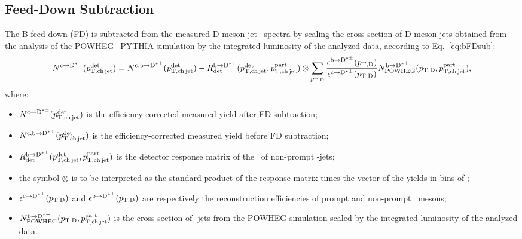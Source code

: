 \subsection{Feed-Down Subtraction}
The B feed-down (FD) is subtracted from the measured D-meson jet \pt\ spectra by scaling the cross-section of D-meson jets obtained from the analysis of the POWHEG+PYTHIA simulation by the integrated luminosity of the analyzed data, according to Eq.~\ref{eq:bFDsub}:
\begin{equation}
N^{\rm c\rightarrow\mathrm{D^{*\pm}}}(p_{\mathrm{T,ch\,jet}}^{\mathrm{det}}) = 
N^{\rm c,b\rightarrow\mathrm{D^{*\pm}}}(p_{\mathrm{T,ch\,jet}}^{\mathrm{det}}) - 
R_{\rm det}^{\rm b\rightarrow\mathrm{D^{*\pm}}}(p_{\mathrm{T,ch\,jet}}^{\mathrm{det}},p_{\mathrm{T,ch\,jet}}^{\mathrm{part}}) \otimes \sum_{p_{\mathrm{T,D}}} \frac{\epsilon^{\rm b\rightarrow\mathrm{D^{*\pm}}}(p_{\mathrm{T,D}})}{\epsilon^{\rm c\rightarrow\mathrm{D^{*\pm}}}(p_{\mathrm{T,D}})} N^{\rm b\rightarrow\mathrm{D^{*\pm}}}_{\rm POWHEG}(p_{\mathrm{T,D}},p_{\mathrm{T,ch\,jet}}^{\mathrm{part}}),
\label{eq:bFDsub}
\end{equation}
where:
\begin{itemize}
\item $N^{\rm c\rightarrow\mathrm{D^{*\pm}}}(p_{\mathrm{T,ch\,jet}}^{\mathrm{det}})$ is the efficiency-corrected measured yield after FD subtraction; 
\item $N^{\rm c,b\rightarrow\mathrm{D^{*\pm}}}(p_{\mathrm{T,ch\,jet}}^{\mathrm{det}})$ is the efficiency-corrected measured yield before FD subtraction;
\item $R_{\rm det}^{\rm b\rightarrow\mathrm{D^{*\pm}}}(p_{\mathrm{T,ch\,jet}}^{\mathrm{det}},p_{\mathrm{T,ch\,jet}}^{\mathrm{part}})$ is the detector response matrix of the \pt\ of non-prompt \Dstar-jets;
\item the symbol $\otimes$ is to be interpreted as the standard product of the response matrix times the vector of the yields in bins of \ptchjetgen;
\item $\epsilon^{\rm c\rightarrow\mathrm{D^{*\pm}}}(p_{\mathrm{T,D}})$ and $\epsilon^{\rm b\rightarrow\mathrm{D^{*\pm}}}(p_{\mathrm{T,D}})$ are respectively the reconstruction efficiencies of prompt and non-prompt \Dstar\ mesons;
\item $N^{\rm b\rightarrow\mathrm{D^{*\pm}}}_{\rm POWHEG}(p_{\mathrm{T,D}},p_{\mathrm{T,ch\,jet}}^{\mathrm{part}})$ is the cross-section of \Dstar-jets from the POWHEG simulation scaled by the integrated luminosity of the analyzed data.
\end{itemize}


